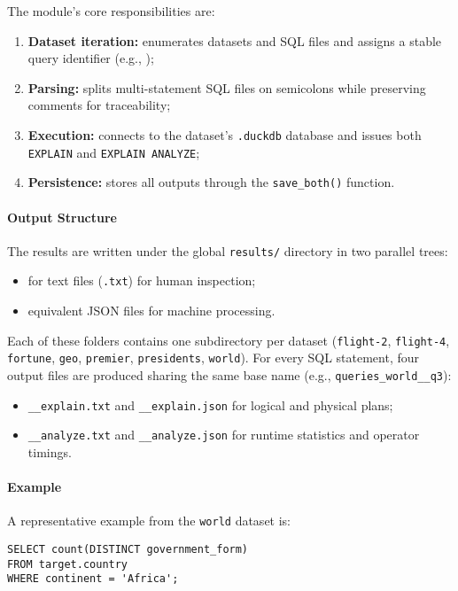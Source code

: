 \documentclass[12pt,a4paper]{article}
\begin{document}
The module’s core responsibilities are:
\begin{enumerate}
  \item \textbf{Dataset iteration:} enumerates datasets and SQL files and assigns a stable query identifier
        (e.g., );
  \item \textbf{Parsing:} splits multi-statement SQL files on semicolons while preserving comments for traceability;
  \item \textbf{Execution:} connects to the dataset’s \texttt{.duckdb} database and issues both \texttt{EXPLAIN} and
        \texttt{EXPLAIN ANALYZE};
  \item \textbf{Persistence:} stores all outputs through the \texttt{save\_both()} function.
\end{enumerate}

\paragraph{Output Structure}
The results are written under the global \texttt{results/} directory in two
parallel trees:
\begin{itemize}
  \item {} for text files (\texttt{.txt}) for human inspection;
  \item {} equivalent JSON files for machine processing.
\end{itemize}

Each of these folders contains one subdirectory per dataset
(\texttt{flight-2}, \texttt{flight-4}, \texttt{fortune}, \texttt{geo},
\texttt{premier}, \texttt{presidents}, \texttt{world}). For every SQL statement,
four output files are produced sharing the same base name (e.g.,
\texttt{queries\_world\_\_q3}):
\begin{itemize}
  \item \texttt{\_\_explain.txt} and \texttt{\_\_explain.json} for logical and physical plans;
  \item \texttt{\_\_analyze.txt} and \texttt{\_\_analyze.json} for runtime statistics and operator timings.
\end{itemize}

\paragraph{Example}
A representative example from the \texttt{world} dataset is:
\begin{verbatim}
SELECT count(DISTINCT government_form)
FROM target.country
WHERE continent = 'Africa';
\end{verbatim}
\end{document}

